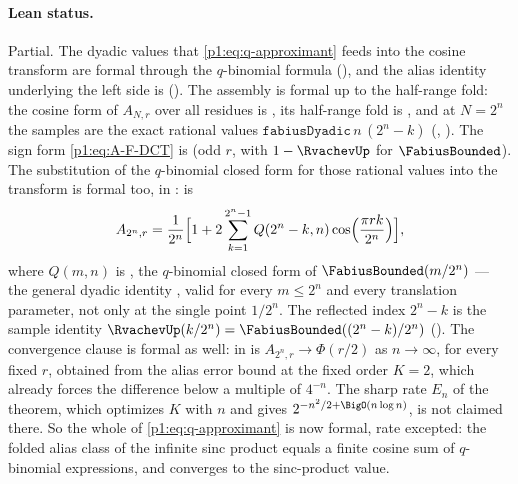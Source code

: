 \documentclass[11pt,oneside]{article}
\theoremstyle{definition}
\theoremstyle{remark}
\newcommand{\PhiU}{\Phi}
\begin{document}
\paragraph{Lean status.}
Partial.  The dyadic values that \eqref{p1:eq:q-approximant} feeds into the cosine transform
are formal through the \(q\)-binomial formula
(), and the alias identity underlying the left side
is  ().  The
assembly is formal up to the half-range fold: the cosine form of \(A_{N,r}\) over all
residues is , its half-range fold is
, and at \(N=2^n\) the samples are the
exact rational values \(\mathtt{fabiusDyadic}\,n\,(2^n-k)\)
(, ).
The sign form \eqref{p1:eq:A-F-DCT} is 
(odd \(r\), with \(1-\RvachevUp\) for \(\FabiusBounded\)).  The substitution of the
\(q\)-binomial closed form for those rational values into the transform is formal too, in
:  is
\[
  A_{2^n,r}=\frac1{2^n}\Bigl[1+2\sum_{k=1}^{2^n-1}
    Q(2^n-k,n)\cos\Bigl(\frac{\pi rk}{2^n}\Bigr)\Bigr],
\]
where \(Q(m,n)\) is , the
\(q\)-binomial closed form of \(\FabiusBounded(m/2^n)\) --- the general dyadic identity
, valid
for every \(m\le2^n\) and every translation parameter, not only at the single point
\(1/2^n\).  The reflected index \(2^n-k\) is the sample identity
\(\RvachevUp(k/2^n)=\FabiusBounded((2^n-k)/2^n)\)
().  The convergence clause is formal as well:
 in  is
\(A_{2^n,r}\to\PhiU(r/2)\) as \(n\to\infty\), for every fixed \(r\), obtained from the alias
error bound  at the fixed order \(K=2\), which
already forces the difference below a multiple of \(4^{-n}\).  The sharp rate \(E_n\) of the
theorem, which optimizes \(K\) with \(n\) and gives \(2^{-n^2/2+\BigO(n\log n)}\), is not
claimed there.  So the whole of \eqref{p1:eq:q-approximant} is now formal, rate excepted: the
folded alias class of the infinite sinc product equals a finite cosine sum of \(q\)-binomial
expressions, and converges to the sinc-product value.
\end{document}
